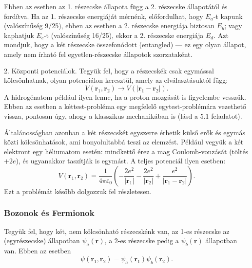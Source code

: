 \documentclass[../main.tex]{subfiles}
\begin{document}
Ebben az esetben az 1. részecske állapota függ a 2. részecske állapotától és fordítva. Ha az 1. részecske energiáját mérnénk, előfordulhat, hogy $E_a$-t kapunk (valószínűség 9/25), ebben az esetben a 2. részecske energiája biztosan $E_b$; vagy kaphatjuk $E_c$-t (valószínűség 16/25), ekkor a 2. részecske energiája $E_d$. Azt mondjuk, hogy a két részecske összefonódott (entangled) — ez egy olyan állapot, amely nem írható fel egyetlen-részecske állapotok szorzataként.

2. Központi potenciálok. Tegyük fel, hogy a részecskék csak egymással kölcsönhatnak, olyan potenciálon keresztül, amely az elválasztásuktól függ:
\begin{equation}
V(\mathbf{r}_1,\mathbf{r}_2) \longrightarrow V(|\mathbf{r}_1-\mathbf{r}_2|).
\tag{5.13}
\end{equation}
A hidrogénatom például ilyen lenne, ha a proton mozgását is figyelembe vesszük. Ebben az esetben a kéttest-probléma egy megfelelő egytest-problémára vezethető vissza, pontosan úgy, ahogy a klasszikus mechanikában is (lásd a 5.1 feladatot).

Általánosságban azonban a két részecskét egyszerre érhetik külső erők és egymás közti kölcsönhatások, ami bonyolultabbá teszi az elemzést. Például vegyük a két elektront egy héliumatom esetén: mindkettő érez a mag Coulomb-vonzását (töltés $+2e$), és ugyanakkor taszítják is egymást. A teljes potenciál ilyen esetben:
\begin{equation}
V(\mathbf{r}_1,\mathbf{r}_2)=\frac{1}{4\pi\varepsilon_0}\!\left(-\frac{2e^2}{|\mathbf{r}_1|}-\frac{2e^2}{|\mathbf{r}_2|}+\frac{e^2}{|\mathbf{r}_1-\mathbf{r}_2|}\right).
\tag{5.14}
\end{equation}
Ezt a problémát később dolgozzuk fel részletesen.

\subsubsection*{Bozonok és Fermionok}
Tegyük fel, hogy két, nem kölcsönható részecskénk van, az 1-es részecske az (egyrészecske) állapotban $\psi_a(\mathbf{r})$, a 2-es részecske pedig a $\psi_b(\mathbf{r})$ állapotban van. Ebben az esetben
\begin{equation}
\psi(\mathbf{r}_1,\mathbf{r}_2)=\psi_a(\mathbf{r}_1)\psi_b(\mathbf{r}_2).
\tag{5.16}
\end{equation}
\end{document}
